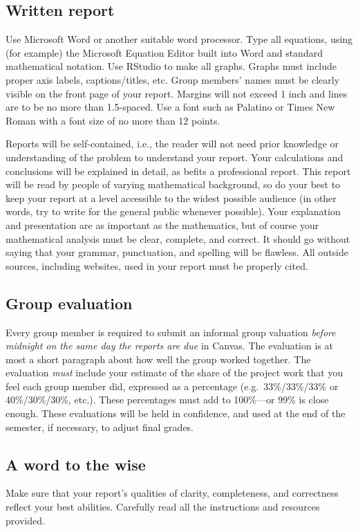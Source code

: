 \documentclass[11pt]{article}\usepackage[]{graphicx}\usepackage[]{color}
\begin{document}
\subsection*{Written report}

Use Microsoft Word or another suitable word processor. Type all equations,
using (for example) the Microsoft Equation Editor built into Word and standard
mathematical notation. Use RStudio to make all graphs. Graphs must include
proper axis labels, captions/titles, etc. Group members' names must be clearly
visible on the front page of your report. Margins will not exceed 1 inch and
lines are to be no more than 1.5-spaced. Use a font such as Palatino or Times
New Roman with a font size of no more than 12 points.

Reports will be self-contained, i.e., the reader will not need prior knowledge
or understanding of the problem to understand your report. Your calculations
and conclusions will be explained in detail, as befits a professional report.
This report will be read by people of varying mathematical background, so do
your best to keep your report at a level accessible to the widest possible
audience (in other words, try to write for the general public whenever
possible). Your explanation and presentation are as important as the
mathematics, but of course your mathematical analysis must be clear, complete,
and correct. It should go without saying that your grammar, punctuation, and
spelling will be flawless. All outside sources, including websites, used in
your report must be properly cited.

\subsection*{Group evaluation}

Every group member is required to submit an informal group valuation
\emph{before midnight on the same day the reports are due} in Canvas. The
evaluation is at most a short paragraph about how well the group worked
together. The evaluation \emph{must} include your estimate of the share of the
project work that you feel each group member did, expressed as a percentage
(e.g.~33\%/33\%/33\% or 40\%/30\%/30\%, etc.). These percentages must add to
100\%---or 99\% is close enough. These evaluations will be held in confidence,
and used at the end of the semester, if necessary, to adjust final grades.

\subsection*{A word to the wise}

Make sure that your report's qualities of clarity, completeness, and
correctness reflect your best abilities. Carefully read all the instructions
and resources provided.
\end{document}
